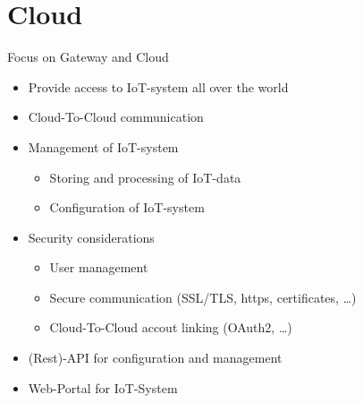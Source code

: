 ﻿\section{Cloud}

\begin{frame}{Focus on Gateway and Cloud}
  \begin{description}[Cloud]
    \item[Cloud]
    \begin{itemize}
      \item Provide access to IoT-system all over the world
      \item Cloud-To-Cloud communication
      \item Management of IoT-system
      \begin{itemize}
        \item Storing and processing of IoT-data
        \item Configuration of IoT-system
      \end{itemize}
      \item Security considerations
      \begin{itemize}
        \item User management
        \item Secure communication (SSL/TLS, https, certificates, \ldots)
        \item Cloud-To-Cloud accout linking (OAuth2, \ldots)
      \end{itemize}
      \item (Rest)-API for configuration and management
      \item Web-Portal for IoT-System
    \end{itemize}
  \end{description}
\end{frame}
